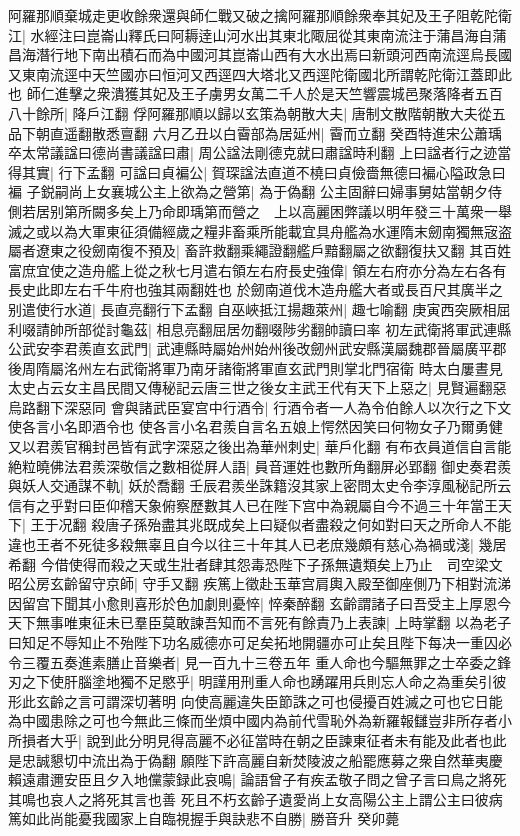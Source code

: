 阿羅那順棄城走更收餘衆還與師仁戰又破之擒阿羅那順餘衆奉其妃及王子阻乾陀衛江|{
	水經注曰崑崙山釋氏曰阿耨逹山河水出其東北陬屈從其東南流注于蒲昌海自蒲昌海潛行地下南出積石而為中國河其崑崙山西有大水出焉曰新頭河西南流逕烏長國又東南流逕中天竺國亦曰恒河又西逕四大塔北又西逕陀衛國北所謂乾陀衛江蓋即此也}
師仁進擊之衆潰獲其妃及王子虜男女萬二千人於是天竺響震城邑聚落降者五百八十餘所|{
	降戶江翻}
俘阿羅那順以歸以玄策為朝散大夫|{
	唐制文散階朝散大夫從五品下朝直遥翻散悉亶翻}
六月乙丑以白霫部為居延州|{
	霫而立翻}
癸酉特進宋公蕭瑀卒太常議諡曰德尚書議諡曰肅|{
	周公諡法剛德克就曰肅諡時利翻}
上曰諡者行之迹當得其實|{
	行下孟翻}
可諡曰貞褊公|{
	賀琛諡法直道不橈曰貞儉嗇無德曰褊心隘政急曰褊}
子鋭嗣尚上女襄城公主上欲為之營第|{
	為于偽翻}
公主固辭曰婦事舅姑當朝夕侍側若居别第所闕多矣上乃命即瑀第而營之　上以高麗困弊議以明年發三十萬衆一舉滅之或以為大軍東征須備經歲之糧非畜乘所能載宜具舟艦為水運隋末劒南獨無宼盗屬者遼東之役劒南復不預及|{
	畜許救翻乘繩證翻艦戶黯翻屬之欲翻復扶又翻}
其百姓富庶宜使之造舟艦上從之秋七月遣右領左右府長史強偉|{
	領左右府亦分為左右各有長史此即左右千牛府也強其兩翻姓也}
於劒南道伐木造舟艦大者或長百尺其廣半之别遣使行水道|{
	長直亮翻行下孟翻}
自巫峽抵江揚趣萊州|{
	趣七喻翻}
庚寅西突厥相屈利啜請帥所部從討龜茲|{
	相息亮翻屈居勿翻啜陟劣翻帥讀曰率}
初左武衛將軍武連縣公武安李君羨直玄武門|{
	武連縣時屬始州始州後改劒州武安縣漢屬魏郡晉屬廣平郡後周隋屬洺州左右武衛將軍乃南牙諸衛將軍直玄武門則掌北門宿衛}
時太白屢晝見太史占云女主昌民間又傳秘記云唐三世之後女主武王代有天下上惡之|{
	見賢遍翻惡烏路翻下深惡同}
會與諸武臣宴宫中行酒令|{
	行酒令者一人為令伯餘人以次行之下文使各言小名即酒令也}
使各言小名君羨自言名五娘上愕然因笑曰何物女子乃爾勇健又以君羨官稱封邑皆有武字深惡之後出為華州刺史|{
	華戶化翻}
有布衣員道信自言能絶粒曉佛法君羨深敬信之數相從屛人語|{
	員音運姓也數所角翻屏必郢翻}
御史奏君羨與妖人交通謀不軌|{
	妖於喬翻}
壬辰君羨坐誅籍沒其家上密問太史令李淳風秘記所云信有之乎對曰臣仰稽天象俯察歷數其人已在陛下宫中為親屬自今不過三十年當王天下|{
	王于况翻}
殺唐子孫殆盡其兆既成矣上曰疑似者盡殺之何如對曰天之所命人不能違也王者不死徒多殺無辜且自今以往三十年其人已老庶幾頗有慈心為禍或淺|{
	幾居希翻}
今借使得而殺之天或生壯者肆其怨毒恐陛下子孫無遺類矣上乃止　司空梁文昭公房玄齡留守京師|{
	守手又翻}
疾篤上徵赴玉華宫肩輿入殿至御座側乃下相對流涕因留宫下聞其小愈則喜形於色加劇則憂悴|{
	悴秦醉翻}
玄齡謂諸子曰吾受主上厚恩今天下無事唯東征未已羣臣莫敢諫吾知而不言死有餘責乃上表諫|{
	上時掌翻}
以為老子曰知足不辱知止不殆陛下功名威德亦可足矣拓地開疆亦可止矣且陛下每决一重囚必令三覆五奏進素膳止音樂者|{
	見一百九十三卷五年}
重人命也今驅無罪之士卒委之鋒刃之下使肝腦塗地獨不足愍乎|{
	明謹用刑重人命也踴躍用兵則忘人命之為重矣引彼形此玄齡之言可謂深切著明}
向使高麗違失臣節誅之可也侵擾百姓滅之可也它日能為中國患除之可也今無此三條而坐煩中國内為前代雪恥外為新羅報讎豈非所存者小所損者大乎|{
	說到此分明見得高麗不必征當時在朝之臣諫東征者未有能及此者也此是忠誠懇切中流出為于偽翻}
願陛下許高麗自新焚陵波之船罷應募之衆自然華夷慶賴遠肅邇安臣且夕入地儻蒙録此哀鳴|{
	論語曾子有疾孟敬子問之曾子言曰鳥之將死其鳴也哀人之將死其言也善}
死且不朽玄齡子遺愛尚上女高陽公主上謂公主曰彼病篤如此尚能憂我國家上自臨視握手與訣悲不自勝|{
	勝音升}
癸卯薨

